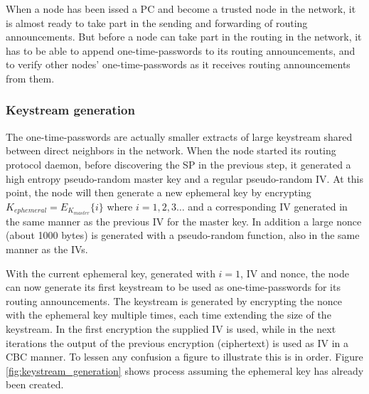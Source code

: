 
When a node has been issed a \ac{PC} and become a trusted node in the network,
it is almost ready to take part in the sending and forwarding of routing
announcements. But before a node can take part in the routing in the network, it
has to be able to append one-time-passwords to its routing announcements, and to
verify other nodes' one-time-passwords as it receives routing announcements from
them.


\subsubsection*{Keystream generation}
The one-time-passwords are actually smaller extracts of large keystream shared
between direct neighbors in the network. When the node started its routing
protocol daemon, before discovering the \ac{SP} in the previous step, it
generated a high entropy pseudo-random master key and a regular pseudo-random
\ac{IV}. At this point, the node will then generate a new ephemeral key by
encrypting $K_{ephemeral} = E_{K_{master}}\{i\}$ where $i = 1,2,3\ldots$ and a
corresponding \ac{IV} generated in the same manner as the previous \ac{IV} for
the master key. In addition a large nonce (about 1000 bytes) is generated with a
pseudo-random function, also in the same manner as the \acp{IV}.

With the current ephemeral key, generated with $i = 1$, \ac{IV} and nonce, the
node can now generate its first keystream to be used as one-time-passwords for
its routing announcements. The keystream is generated by encrypting the nonce
with the ephemeral key multiple times, each time extending the size of the
keystream. In the first encryption the supplied \ac{IV} is used, while in the
next iterations the output of the previous encryption (ciphertext) is used as
\ac{IV} in a \ac{CBC} manner. To lessen any confusion a figure to illustrate
this is in order. Figure \ref{fig:keystream_generation} shows process assuming
the ephemeral key has already been created.

